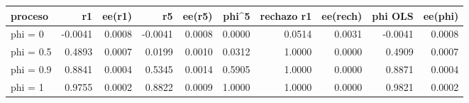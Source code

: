 \begin{tabular}{lrrrrrrrrr}
\toprule
proceso & r1 & ee(r1) & r5 & ee(r5) & phi\textasciicircum{}5 & rechazo r1 & ee(rech) & phi OLS & ee(phi) \\
\midrule
phi = 0 & -0.0041 & 0.0008 & -0.0041 & 0.0008 & 0.0000 & 0.0514 & 0.0031 & -0.0041 & 0.0008 \\
phi = 0.5 & 0.4893 & 0.0007 & 0.0199 & 0.0010 & 0.0312 & 1.0000 & 0.0000 & 0.4909 & 0.0007 \\
phi = 0.9 & 0.8841 & 0.0004 & 0.5345 & 0.0014 & 0.5905 & 1.0000 & 0.0000 & 0.8871 & 0.0004 \\
phi = 1 & 0.9755 & 0.0002 & 0.8822 & 0.0009 & 1.0000 & 1.0000 & 0.0000 & 0.9821 & 0.0002 \\
\bottomrule
\end{tabular}

